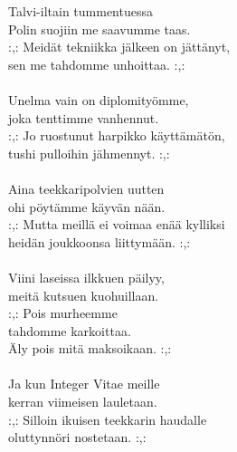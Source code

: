 
Talvi-iltain tummentuessa \\ 
Polin suojiin me saavumme taas. \\ 
:,: Meidät tekniikka jälkeen on jättänyt, \\ 
sen me tahdomme unhoittaa. :,: \\ 
\hspace{10mm} \\ 
Unelma vain on diplomityömme, \\ 
joka tenttimme vanhennut. \\ 
:,: Jo ruostunut harpikko käyttämätön, \\ 
tushi pulloihin jähmennyt. :,: \\ 
\hspace{10mm} \\ 
Aina teekkaripolvien uutten \\ 
ohi pöytämme käyvän nään. \\ 
:,: Mutta meillä ei voimaa enää kylliksi \\ 
heidän joukkoonsa liittymään. :,: \\ 
\hspace{10mm} \\ 
Viini laseissa ilkkuen päilyy, \\ 
meitä kutsuen kuohuillaan. \\ 
:,: Pois murheemme \\ 
tahdomme karkoittaa. \\ 
Äly pois mitä maksoikaan. :,: \\ 
\hspace{10mm} \\ 
Ja kun Integer Vitae meille \\ 
kerran viimeisen lauletaan. \\ 
:,: Silloin ikuisen teekkarin haudalle \\ 
oluttynnöri nostetaan. :,: